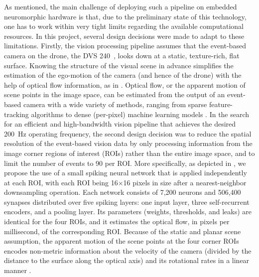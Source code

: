As mentioned, the main challenge of deploying such a pipeline on embedded neuromorphic hardware is that, due to the preliminary state of this technology, one has to work within very tight limits regarding the available computational resources. In this project, several design decisions were made to adapt to these limitations. Firstly, the vision processing pipeline assumes that the event-based camera on the drone, the DVS 240~\cite{brandli2014240}, looks down at a static, texture-rich, flat surface. Knowing the structure of the visual scene in advance simplifies the estimation of the ego-motion of the camera (and hence of the drone) with the help of optical flow information, as in \cite{decroon2013opticflow,decroon2016monocular,pijnackerhordijk2018vertical,hagenaars2020evolved,dupeyroux2021neuromorphic}. Optical flow, or the apparent motion of scene points in the image space, can be estimated from the output of an event-based camera with a wide variety of methods, ranging from sparse feature-tracking algorithms \cite{benosman2012asynchronous} to dense (per-pixel) machine learning models \cite{zhu2018evflownet,gehrig2021eraft,hagenaars2021selfsupervised}. In the search for an efficient and high-bandwidth vision pipeline that achieves the desired 200~Hz operating frequency, the second design decision was to reduce the spatial resolution of the event-based vision data by only processing information from the image corner regions of interest (ROIs) rather than the entire image space, and to limit the number of events to 90 per ROI. More specifically, as depicted in , we propose the use of a small spiking neural network that is applied independently at each ROI, with each ROI being 16$\times$16 pixels in size after a nearest-neighbor downsampling operation. Each network consists of 7,200 neurons and 506,400 synapses distributed over five spiking layers: one input layer, three self-recurrent encoders, and a pooling layer. Its parameters (weights, thresholds, and leaks) are identical for the four ROIs, and it estimates the optical flow, in pixels per millisecond, of the corresponding ROI.
Because of the static and planar scene assumption, the apparent motion of the scene points at the four corner ROIs encodes non-metric information about the velocity of the camera (divided by the distance to the surface along the optical axis) and its rotational rates in a linear manner \cite{baker2006parameterizing}.

